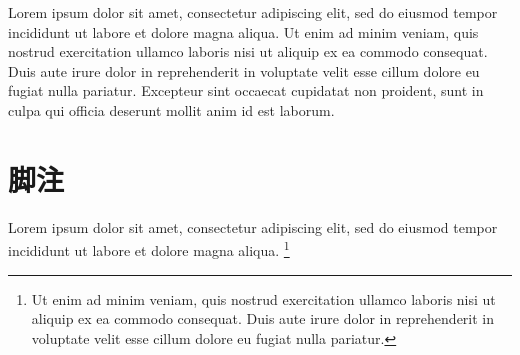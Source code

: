 Lorem ipsum dolor sit amet, consectetur adipiscing elit, sed do eiusmod tempor
incididunt ut labore et dolore magna aliqua.
Ut enim ad minim veniam, quis nostrud exercitation ullamco laboris nisi ut
aliquip ex ea commodo consequat.
Duis aute irure dolor in reprehenderit in voluptate velit esse cillum dolore eu
fugiat nulla pariatur.
Excepteur sint occaecat cupidatat non proident, sunt in culpa qui officia
deserunt mollit anim id est laborum.



\section{脚注}

Lorem ipsum dolor sit amet, consectetur adipiscing elit, sed do eiusmod tempor
incididunt ut labore et dolore magna aliqua.
\footnote{Ut enim ad minim veniam, quis nostrud exercitation ullamco laboris
  nisi ut aliquip ex ea commodo consequat.
  Duis aute irure dolor in reprehenderit in voluptate velit esse cillum dolore
  eu fugiat nulla pariatur.}
